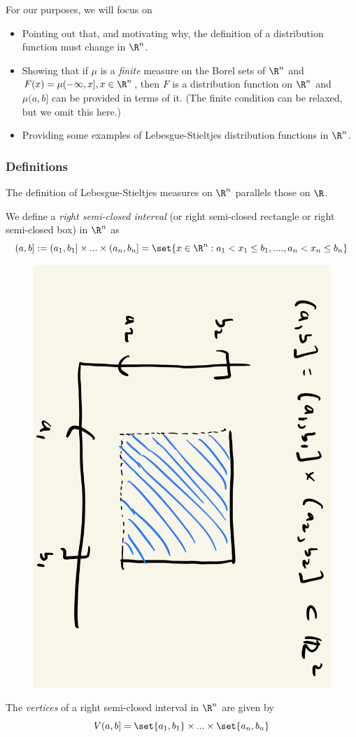 \documentclass{article} %
\begin{document}
For our purposes, we will focus on
\begin{itemize}
\item Pointing out that, and motivating why, the definition of a distribution function must change in $\R^n$.
\item Showing that if $\mu$ is a \textit{finite} measure on the Borel sets of $\R^n$ and $F(x) = \mu(-\infty, x], x \in \R^n$, then $F$ is a distribution function on $\R^n$ and $\mu(a,b]$ can be provided in terms of it.     (The finite condition can be relaxed, but we omit this here.) %
\item Providing some examples of Lebesgue-Stieltjes distribution functions in $\R^n$. 
\end{itemize}

 
\subsubsection{Definitions}
The definition of Lebesgue-Stieltjes measures on $\R^n$ parallels those on $\R$.

\begin{definition}
We define a \textit{right semi-closed interval} (or right semi-closed rectangle or right semi-closed box) in $\R^n$ as
\[ (a,b] :=	(a_1,b_1] \times ... \times (a_n, b_n]  = \set{x \in \R^n : a_1 < x_1 \leq b_1, ...., a_n < x_n \leq b_n }\]
\end{definition}


\begin{figure}[H]
\centering
\includegraphics[angle=90, width=.3\textwidth]{images/rsc_rectangle_in_R2}	
\end{figure}

\begin{definition}
The \textit{vertices} of a right semi-closed interval in $\R^n$ are given by
\[ V(a,b] = \set{a_1,b_1} \times ... \times \set{a_n, b_n}\]
\label{def:vertices_of_rsc_interval_in_Rn}
\end{definition}
\end{document}
